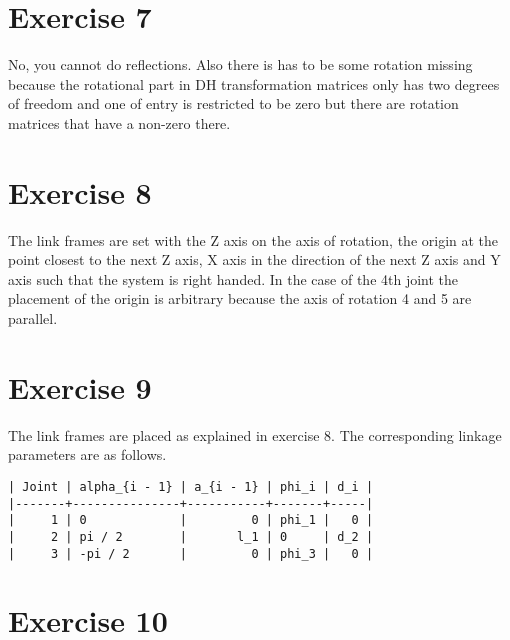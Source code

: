 \documentclass[10pt,a4paper]{article}
\begin{document}
\section*{Exercise 7}

No, you cannot do reflections.
Also there is has to be some rotation missing because the rotational part in DH transformation matrices only has two degrees of freedom and one of entry is restricted to be zero but there are rotation matrices that have a non-zero there.

\section*{Exercise 8}

The link frames are set with the Z axis on the axis of rotation, the origin at the point closest to the next Z axis, X axis in the direction of the next Z axis and Y axis such that the system is right handed.
In the case of the 4th joint the placement of the origin is arbitrary because the axis of rotation 4 and 5 are parallel.

\section*{Exercise 9}

The link frames are placed as explained in exercise 8.
The corresponding linkage parameters are as follows.
\begin{verbatim}
| Joint | alpha_{i - 1} | a_{i - 1} | phi_i | d_i |
|-------+---------------+-----------+-------+-----|
|     1 | 0             |         0 | phi_1 |   0 |
|     2 | pi / 2        |       l_1 | 0     | d_2 |
|     3 | -pi / 2       |         0 | phi_3 |   0 |
\end{verbatim}

\section*{Exercise 10}
\end{document}
